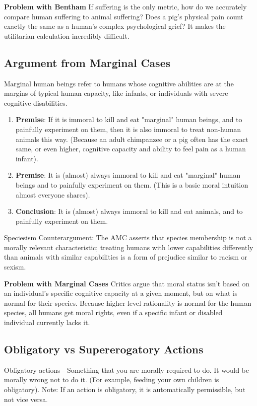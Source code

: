 \documentclass[12pt]{article}
\begin{document}
\noindent\textbf{Problem with Bentham}
If suffering is the only metric, how do we accurately compare human suffering to animal suffering?
Does a pig's physical pain count exactly the same as a human's complex psychological grief?
It makes the utilitarian calculation incredibly difficult.

\subsection{Argument from Marginal Cases}
Marginal human beings refer to humans whose cognitive abilities are at the margins of typical human capacity, like infants, or individuals with severe cognitive disabilities.
\begin{enumerate}
    \item \textbf{Premise}: If it is immoral to kill and eat "marginal" human beings, and to painfully experiment on them, then it is also immoral to treat non-human animals this way. (Because an adult chimpanzee or a pig often has the exact same, or even higher, cognitive capacity and ability to feel pain as a human infant).
    \item \textbf{Premise}: It is (almost) always immoral to kill and eat "marginal" human beings and to painfully experiment on them. (This is a basic moral intuition almost everyone shares).
    \item \textbf{Conclusion}: It is (almost) always immoral to kill and eat animals, and to painfully experiment on them.
\end{enumerate}
Speciesism Counterargument: The AMC asserts that species membership is not a morally relevant characteristic; treating humans with lower capabilities differently than animals with similar capabilities is a form of prejudice similar to racism or sexism.

\noindent\textbf{Problem with Marginal Cases}
Critics argue that moral status isn't based on an individual's specific cognitive capacity at a given moment, but on what is normal for their species.
Because higher-level rationality is normal for the human species, all humans get moral rights, even if a specific infant or disabled individual currently lacks it.

\subsection{Obligatory vs Supererogatory Actions}
Obligatory actions - Something that you are morally required to do. It would be morally wrong not to do it. (For example, feeding your own children is obligatory). Note: If an action is obligatory, it is automatically permissible, but not vice versa.
\end{document}

